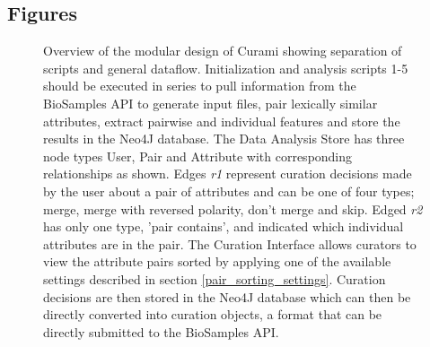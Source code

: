 \documentclass{bmcart}
\begin{document}
\begin{backmatter}



\section*{Figures}
  \begin{figure}[h!]
  \caption{
      Overview of the modular design of Curami showing separation of scripts and general dataflow. Initialization and analysis scripts 1-5 should be executed in series to pull information from the BioSamples API to generate input files, pair lexically similar attributes, extract pairwise and individual features and store the results in the Neo4J database. The Data Analysis Store has three node types User, Pair and Attribute with corresponding relationships as shown. Edges \textit{r1} represent curation decisions made by the user about a pair of attributes and can be one of four types; merge, merge with reversed polarity, don't merge and skip. Edged \textit{r2} has only one type, 'pair contains', and indicated which individual attributes are in the pair. The Curation Interface allows curators to view the attribute pairs sorted by applying one of the available settings described in section \ref{pair_sorting_settings}. Curation decisions are then stored in the Neo4J database which can then be directly converted into curation objects, a format that can be directly submitted to the BioSamples API.}
\label{fig:workflow}
\end{figure}




\end{backmatter}
\end{document}
